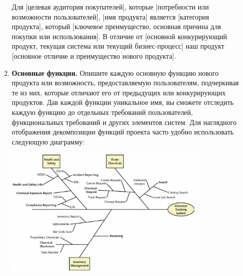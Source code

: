 \documentclass{../../text-style}
\begin{document}
\begin{enumerate}
\begin{enumerate}
        Для [целевая аудитория покупателей], которые [потребности или возможности пользователей], [имя продукта] является [категория продукта], который [ключевое преимущество, основная причина для покупки или использования].
        В отличие от [основной конкурирующий продукт, текущая система или текущий бизнес-процесс] наш продукт [основное отличие и преимущество нового продукта].
        \item \textbf{Основные функции.}
        Опишите каждую основную функцию нового продукта или возможность, предоставляемую пользователям, подчеркивая те из них, которые отличают его от предыдущих или конкурирующих продуктов.
        Дав каждой функции уникальное имя, вы сможете отследить каждую функцию до отдельных требований пользователей, функциональных требований и других элементов систем.
        Для наглядного отображения декомпозиции функций проекта часто удобно использовать следующую диаграмму:
        \begin{center}
            \includegraphics[width=0.8\textwidth]{featureTree.png}
        \end{center}


\end{enumerate}
\end{enumerate}
\end{document}
